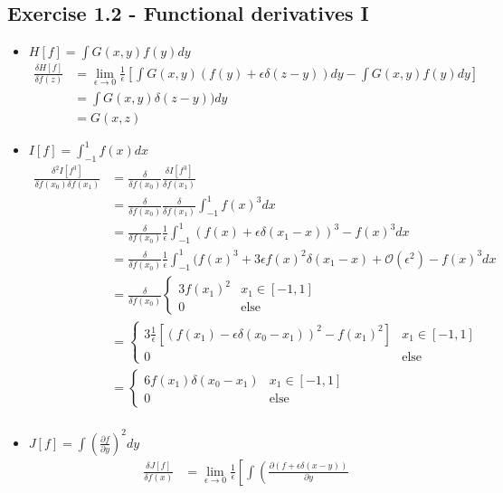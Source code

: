 \documentclass[../main.tex]{subfiles}
\begin{document}
\subsection*{Exercise 1.2 - Functional derivatives I}
\begin{itemize}
\item $H[f]=\int G(x,y)f(y)dy$ 
\begin{align}
\frac{\delta H[f]}{\delta f(z)}
&=\lim_{\epsilon\rightarrow0}\frac{1}{\epsilon}\left[\int G(x,y)(f(y)+\epsilon\delta(z-y))dy-\int G(x,y)f(y)dy\right]\\
&=\int G(x,y)\delta(z-y))dy\\
&=G(x,z)
\end{align}
\item $I[f]=\int_{-1}^1f(x)dx$
\begin{align}
\frac{\delta^2I[f^3]}{\delta f(x_0)\delta f(x_1)}
&=\frac{\delta}{\delta f(x_0)}\frac{\delta I[f^3]}{\delta f(x_1)}\\
&=\frac{\delta}{\delta f(x_0)}\frac{\delta}{\delta f(x_1)}\int_{-1}^1f(x)^3dx\\
&=\frac{\delta}{\delta f(x_0)}\frac{1}{\epsilon}\int_{-1}^1(f(x)+\epsilon\delta(x_1-x))^3-f(x)^3dx\\
&=\frac{\delta}{\delta f(x_0)}\frac{1}{\epsilon}\int_{-1}^1(f(x)^3+3\epsilon f(x)^2\delta(x_1-x)+\mathcal{O}(\epsilon^2)-f(x)^3dx\\
&=\frac{\delta}{\delta f(x_0)}
\left\{
\begin{matrix}
 3f(x_1)^2 & x_1\in[-1,1]\\
 0         & \text{else}
\end{matrix}
\right.\\
&=
\left\{
\begin{matrix}
 3\frac{1}{\epsilon}[(f(x_1)-\epsilon\delta(x_0-x_1))^2-f(x_1)^2] & x_1\in[-1,1]\\
 0         & \text{else}
\end{matrix}
\right.\\
&=
\left\{
\begin{matrix}
 6f(x_1)\delta(x_0-x_1) & x_1\in[-1,1]\\
 0         & \text{else}
\end{matrix}
\right.\\
\end{align}
\item $J[f]=\int\left(\frac{\partial f}{\partial y}
\right)^2dy$
\begin{align}
\frac{\delta J[f]}{\delta f(x)}
&=\lim_{\epsilon\rightarrow0}\frac{1}{\epsilon}\left[\int\left(\frac{\partial (f+\epsilon\delta(x-y))}{\partial y}

\end{align}
\end{itemize}
\end{document}

